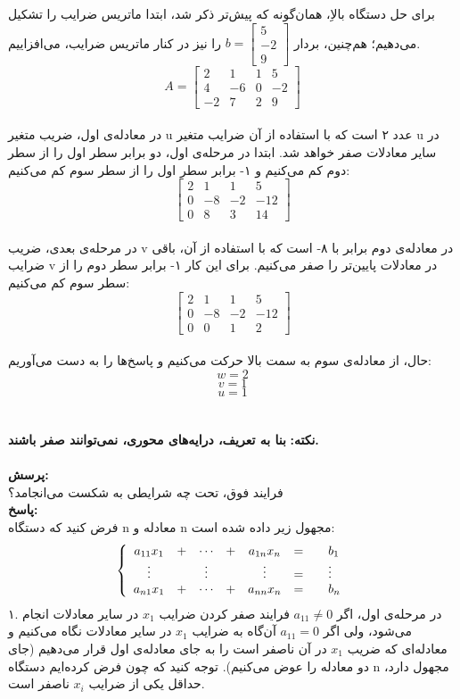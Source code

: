 برای حل دستگاه بالاِ، همان‌گونه که پیش‌تر ذکر شد، ابتدا ماتریس ضرایب را تشکیل می‌دهیم؛ هم‌چنین، بردار 
$ b = \begin{bmatrix}5\\-2\\9\end{bmatrix} $ 
را نیز در کنار ماتریس ضرایب، می‌افزاییم. \\
$$A = \begin{bmatrix}2&1&1&5\\4&-6&0&-2\\-2&7&2&9\end{bmatrix}$$ \\
در معادله‌ی اول، ضریب متغیر u عدد ۲ است که با استفاده از آن ضرایب متغیر u در سایر معادلات صفر خواهد شد. ابتدا در مرحله‌ی اول، دو برابر سطر اول را از سطر دوم کم می‌کنیم و ۱- برابر سطر اول را از سطر سوم کم می‌کنیم:
$$\begin{bmatrix}2&1&1&5\\0&-8&-2&-12\\0&8&3&14\end{bmatrix}$$ \\
در مرحله‌ی بعدی، ضریب v در معادله‌ی دوم برابر با ۸-  است که با استفاده از آن، باقی ضرایب v در معادلات پایین‌تر را صفر می‌کنیم. برای این کار ۱-  برابر سطر دوم را از سطر سوم کم می‌کنیم:
$$\begin{bmatrix}2&1&1&5\\0&-8&-2&-12\\0&0&1&2\end{bmatrix}$$ \\
حال، از معادله‌ی سوم به سمت بالا حرکت می‌کنیم و پاسخ‌ها را به دست می‌آوریم:\\
$$w = 2$$
$$v = 1$$
$$u = 1$$\\\\
\textbf{نکته: }
\textbf{بنا به تعریف، درایه‌های محوری، نمی‌توانند صفر باشند.}\\\\
\textbf{پرسش:}\\
فرایند فوق، تحت چه شرایطی به شکست می‌انجامد؟\\
\textbf{پاسخ:}\\
فرض کنید که دستگاه n معادله و n مجهول زیر داده شده است:\\
\[
\left\{
\begin{array}{cccccc@{\qquad}l}
a_{11} x_1 & +  &  \cdots     & + &   a_{1n}x_n   &   = &b_1 \\
\vdots     &    &   \vdots    &   &  \vdots       &   = &\vdots \\
a_{n1}x_1  & +  &   \cdots    & + &   a_{nn}x_n   &   = & b_n
\end{array}
\right.
\]
۱. در مرحله‌ی اول، اگر $a_{11} \neq 0$ فرایند صفر کردن ضرایب $x_{1}$ در سایر معادلات انجام می‌شود، ولی اگر $a_{11} = 0$ آن‌گاه به ضرایب $x_{1}$ در سایر معادلات نگاه می‌کنیم و معادله‌ای که ضریب $x_{1}$ در آن ناصفر است را به جای معادله‌ی اول قرار می‌دهیم (جای دو معادله را عوض می‌کنیم). توجه کنید که چون فرض کرده‌ایم دستگاه n مجهول دارد، حداقل یکی از ضرایب $x_{i}$ ناصفر است.


